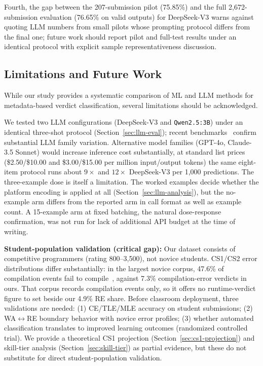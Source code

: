 \documentclass[acmsmall]{acmart}
\begin{document}
Fourth, the gap between the 207-submission pilot (75.85\%) and the full
2,672-submission evaluation (76.65\% on valid outputs) for DeepSeek-V3 warns
against quoting LLM numbers from small pilots whose prompting protocol differs
from the final one; future work should report pilot and full-test results
under an identical protocol with explicit sample representativeness discussion.

\subsection{Limitations and Future Work}\label{sec:limitations}

While our study provides a systematic comparison of ML and LLM methods
for metadata-based verdict classification, several limitations should be
acknowledged.

We tested two LLM configurations (DeepSeek-V3 and \texttt{Qwen2.5:3B}) under an identical three-shot
protocol (Section~\ref{sec:llm-eval}); recent benchmarks~\cite{denny2024prompt}
confirm substantial LLM family variation. Alternative model families (GPT-4o, Claude-3.5 Sonnet) would increase inference cost substantially, at standard list prices (\$2.50/\$10.00 and \$3.00/\$15.00 per million input/output tokens) the same eight-item protocol runs about $9\times$ and $12\times$ DeepSeek-V3 per 1{,}000 predictions. The three-example dose is itself a limitation. The worked examples decide whether the platform encoding is applied at all (Section~\ref{sec:llm-analysis}), but the no-example arm differs from the reported arm in call format as well as example count. A 15-example arm at fixed batching, the natural dose-response confirmation, was not run for lack of additional API budget at the time of writing.

\textbf{Student-population validation (critical gap):} Our dataset consists of competitive
programmers (rating 800--3,500), not novice students. CS1/CS2 error distributions differ substantially: in the largest novice corpus, 47.6\% of compilation events fail to compile~\cite{altadmri2015most}, against 7.3\% compilation-error verdicts in ours. That corpus records compilation events only, so it offers no runtime-verdict figure to set beside our 4.9\% RE share. Before classroom deployment, three validations are needed: (1) CE/TLE/MLE accuracy on student submissions; (2) WA$\leftrightarrow$RE boundary behavior with novice error profiles; (3) whether automated classification translates to improved learning outcomes (randomized controlled trial). We provide a theoretical CS1 projection (Section~\ref{sec:cs1-projection}) and skill-tier analysis (Section~\ref{sec:skill-tier}) as partial evidence, but these do not substitute for direct student-population validation.
\end{document}
